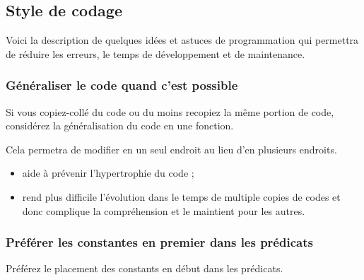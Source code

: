\subsection{Style de codage}
Voici la description de quelques id\'ees et astuces de programmation qui permettra de r\'eduire les erreurs, le temps de d\'eveloppement et de maintenance.

\subsubsection{G\'en\'eraliser le code quand c'est possible}

Si vous copiez-coll\'e du code ou du moins recopiez la m\^eme portion de code, consid\'erez la g\'en\'eralisation du code en une fonction.

Cela permetra de modifier en un seul endroit au lieu d'en plusieurs endroits.

\begin{itemize}
\item aide \`a pr\'evenir l'hypertrophie du code ;
\item rend plus difficile l'\'evolution dans le temps de multiple copies de codes et donc complique la compr\'ehension et le maintient pour les autres.
\end{itemize}

\subsubsection{Pr\'ef\'erer les constantes en premier dans les pr\'edicats}
Pr\'ef\'erez le placement des constants en d\'ebut dans les pr\'edicats.

